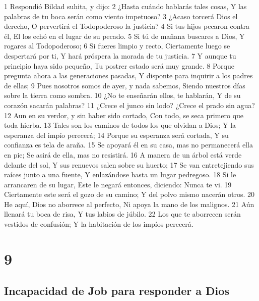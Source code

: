 1 Respondió Bildad suhita, y dijo:
2 ¿Hasta cuándo hablarás tales cosas,
Y las palabras de tu boca serán como viento impetuoso?
3 ¿Acaso torcerá Dios el derecho,
O pervertirá el Todopoderoso la justicia?
4 Si tus hijos pecaron contra él,
El los echó en el lugar de su pecado.
5 Si tú de mañana buscares a Dios,
Y rogares al Todopoderoso;
6 Si fueres limpio y recto,
Ciertamente luego se despertará por ti,
Y hará próspera la morada de tu justicia.
7 Y aunque tu principio haya sido pequeño,
Tu postrer estado será muy grande.
8 Porque pregunta ahora a las generaciones pasadas,
Y disponte para inquirir a los padres de ellas;
9 Pues nosotros somos de ayer, y nada sabemos,
Siendo nuestros días sobre la tierra como sombra.
10 ¿No te enseñarán ellos, te hablarán,
Y de su corazón sacarán palabras?
11 ¿Crece el junco sin lodo?
¿Crece el prado sin agua?
12 Aun en su verdor, y sin haber sido cortado,
Con todo, se seca primero que toda hierba.
13 Tales son los caminos de todos los que olvidan a Dios;
Y la esperanza del impío perecerá;
14 Porque su esperanza será cortada,
Y su confianza es tela de araña.
15 Se apoyará él en su casa, mas no permanecerá ella en pie;
Se asirá de ella, mas no resistirá.
16 A manera de un árbol está verde delante del sol,
Y sus renuevos salen sobre su huerto;
17 Se van entretejiendo sus raíces junto a una fuente,
Y enlazándose hasta un lugar pedregoso.
18 Si le arrancaren de su lugar,
Este le negará entonces, diciendo: Nunca te vi.
19 Ciertamente este será el gozo de su camino;
Y del polvo mismo nacerán otros.
20 He aquí, Dios no aborrece al perfecto,
Ni apoya la mano de los malignos.
21 Aún llenará tu boca de risa,
Y tus labios de júbilo.
22 Los que te aborrecen serán vestidos de confusión;
Y la habitación de los impíos perecerá.

\chapter{9}

\section*{Incapacidad de Job para responder a Dios}

